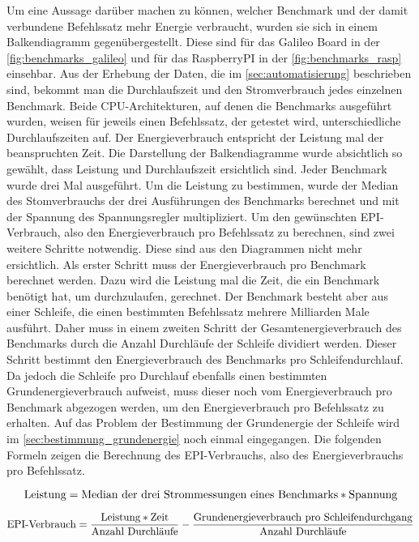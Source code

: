Um eine Aussage darüber machen zu können, welcher Benchmark und der damit verbundene Befehlssatz mehr Energie verbraucht, wurden sie sich in einem Balkendiagramm gegenübergestellt. Diese sind für das Galileo Board in der \autoref{fig:benchmarks_galileo} und für das RaspberryPI in der \autoref{fig:benchmarks_rasp} einsehbar. Aus der Erhebung der Daten, die im \autoref{sec:automatisierung} beschrieben sind, bekommt man die Durchlaufszeit und den Stromverbrauch jedes einzelnen Benchmark. Beide CPU-Architekturen, auf denen die Benchmarks ausgeführt wurden, weisen für jeweils einen Befehlssatz, der getestet wird, unterschiedliche Durchlaufszeiten auf. Der Energieverbrauch entspricht der Leistung mal der beanspruchten Zeit. Die Darstellung der Balkendiagramme wurde absichtlich so gewählt, dass Leistung und Durchlaufszeit ersichtlich sind. Jeder Benchmark wurde drei Mal ausgeführt. Um die Leistung zu bestimmen, wurde der Median des Stomverbrauchs der drei Ausführungen des Benchmarks berechnet und mit der Spannung des Spannungsregler multipliziert. Um den gewünschten EPI-Verbrauch, also den Energieverbrauch pro Befehlssatz zu berechnen, sind zwei weitere Schritte notwendig. Diese sind aus den Diagrammen nicht mehr ersichtlich. Als erster Schritt muss der Energieverbrauch pro Benchmark berechnet werden. Dazu wird die Leistung mal die Zeit, die ein Benchmark benötigt hat, um durchzulaufen, gerechnet. Der Benchmark besteht aber aus einer Schleife, die einen bestimmten Befehlssatz mehrere Milliarden Male ausführt. Daher muss in einem zweiten Schritt der Gesamtenergieverbrauch des Benchmarks durch die Anzahl Durchläufe der Schleife dividiert werden. Dieser Schritt bestimmt den Energieverbrauch des Benchmarks pro Schleifendurchlauf. Da jedoch die Schleife pro Durchlauf ebenfalls einen bestimmten Grundenergieverbrauch aufweist, muss dieser noch vom Energieverbrauch pro Benchmark abgezogen werden, um den Energieverbrauch pro Befehlssatz zu erhalten. Auf das Problem der Bestimmung der Grundenergie der Schleife wird im \autoref{sec:bestimmung_grundenergie} noch einmal eingegangen. Die folgenden Formeln zeigen die Berechnung des EPI-Verbrauchs, also des Energieverbrauchs pro Befehlssatz.

\[ \textnormal{Leistung} = \textnormal{Median der drei Strommessungen eines Benchmarks} * \textnormal{Spannung} \]

\[\textnormal{EPI-Verbrauch} = \frac{\textnormal{Leistung} * \textnormal{Zeit}}{\textnormal{Anzahl Durchl{\"a}ufe}} - \frac{\textnormal{Grundenergieverbrauch pro Schleifendurchgang}}{\textnormal{Anzahl Durchl{\"a}ufe}}  \]

